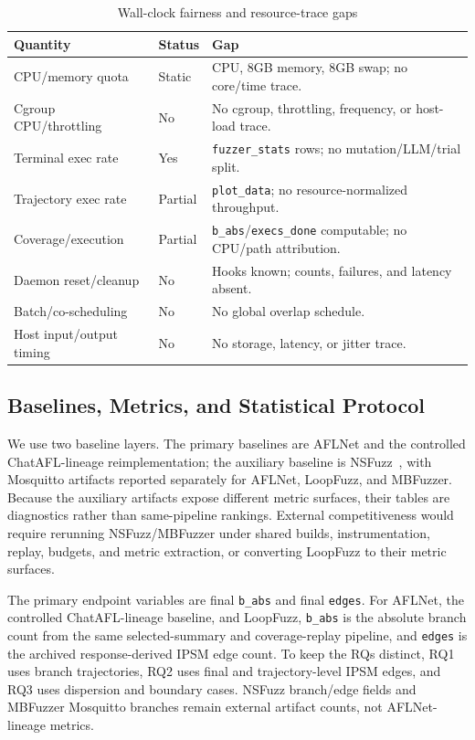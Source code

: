 \documentclass[final,5p,times,number]{elsarticle}
\begin{document}
\begin{table}[!t]
\centering
\caption{Wall-clock fairness and resource-trace gaps}
\label{tab:wallclock_resource_status}
{\scriptsize
\setlength{\tabcolsep}{3.6pt}
\renewcommand{\arraystretch}{1.05}
\begin{tabularx}{0.88\textwidth}{>{\raggedright\arraybackslash}p{}
>{\centering\arraybackslash}p{}
>{\raggedright\arraybackslash}X}
\toprule
Quantity & Status & Gap \\
\midrule
CPU/memory quota & Static & 1 CPU, 8GB memory, 8GB swap; no core/time trace. \\
Cgroup CPU/throttling & No & No cgroup, throttling, frequency, or host-load trace. \\
Terminal exec rate & Yes & \texttt{fuzzer\_stats} rows; no mutation/LLM/trial split. \\
Trajectory exec rate & Partial & \texttt{plot\_data}; no resource-normalized throughput. \\
Coverage/execution & Partial & \texttt{b\_abs}/\texttt{execs\_done} computable; no CPU/path attribution. \\
Daemon reset/cleanup & No & Hooks known; counts, failures, and latency absent. \\
Batch/co-scheduling & No & No global overlap schedule. \\
Host input/output timing & No & No storage, latency, or jitter trace. \\
\bottomrule
\end{tabularx}
}
\end{table}

\subsection{Baselines, Metrics, and Statistical Protocol}
We use two baseline layers. The primary baselines are AFLNet and the controlled ChatAFL-lineage reimplementation; the auxiliary baseline is NSFuzz~\cite{nsfuzz}, with Mosquitto artifacts reported separately for AFLNet, LoopFuzz, and MBFuzzer. Because the auxiliary artifacts expose different metric surfaces, their tables are diagnostics rather than same-pipeline rankings. External competitiveness would require rerunning NSFuzz/MBFuzzer under shared builds, instrumentation, replay, budgets, and metric extraction, or converting LoopFuzz to their metric surfaces.

The primary endpoint variables are final \texttt{b\_abs} and final \texttt{edges}. For AFLNet, the controlled ChatAFL-lineage baseline, and LoopFuzz, \texttt{b\_abs} is the absolute branch count from the same selected-summary and coverage-replay pipeline, and \texttt{edges} is the archived response-derived IPSM edge count. To keep the RQs distinct, RQ1 uses branch trajectories, RQ2 uses final and trajectory-level IPSM edges, and RQ3 uses dispersion and boundary cases. NSFuzz branch/edge fields and MBFuzzer Mosquitto branches remain external artifact counts, not AFLNet-lineage metrics.
\end{document}
